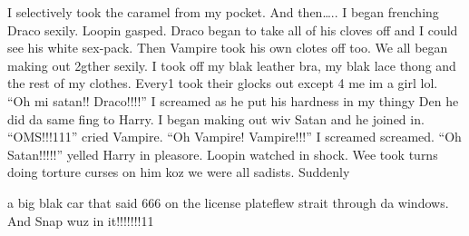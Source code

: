 I selectively took the caramel from my pocket. And then….. I began frenching Draco sexily. Loopin gasped. Draco began to take all of his cloves off and I could see his white sex-pack. Then Vampire took his own clotes off too. We all began making out 2gther sexily. I took off my blak leather bra, my blak lace thong and the rest of my clothes. Every1 took their glocks out except 4 me im a girl lol. \enquote{Oh mi satan!! Draco!!!!} I screamed as he put his hardness in my thingy Den he did da same fing to Harry. I began making out wiv Satan and he joined in. \enquote{OMS!!!111} cried Vampire. \enquote{Oh Vampire! Vampire!!!} I screamed screamed. \enquote{Oh Satan!!!!!} yelled Harry in pleasore. Loopin watched in shock. Wee took turns doing torture curses on him koz we were all sadists. Suddenly\dotfill

\dotfill a big blak car that said 666 on the license plate\newline flew strait through da windows. And Snap wuz in it!!!!!!!11


